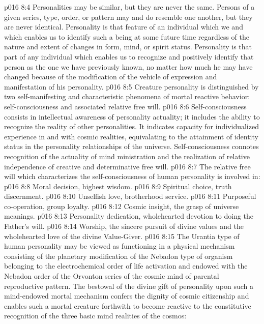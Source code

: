\vs p016 8:4 Personalities may be similar, but they are never the same. Persons of a given series, type, order, or pattern may and do resemble one another, but they are never identical. Personality is that feature of an individual which we  and which enables us to identify such a being at some future time regardless of the nature and extent of changes in form, mind, or spirit status. Personality is that part of any individual which enables us to recognize and positively identify that person as the one we have previously known, no matter how much he may have changed because of the modification of the vehicle of expression and manifestation of his personality.
\vs p016 8:5 \pc Creature personality is distinguished by two self\hyp{}manifesting and characteristic phenomena of mortal reactive behavior: self\hyp{}consciousness and associated relative free will.
\vs p016 8:6 Self\hyp{}consciousness consists in intellectual awareness of personality actuality; it includes the ability to recognize the reality of other personalities. It indicates capacity for individualized experience in and with cosmic realities, equivalating to the attainment of identity status in the personality relationships of the universe. Self\hyp{}consciousness connotes recognition of the actuality of mind ministration and the realization of relative independence of creative and determinative free will.
\vs p016 8:7 \pc The relative free will which characterizes the self\hyp{}consciousness of human personality is involved in:
\vs p016 8:8 \bibnobreakspace Moral decision, highest wisdom.
\vs p016 8:9 \bibnobreakspace Spiritual choice, truth discernment.
\vs p016 8:10 \bibnobreakspace Unselfish love, brotherhood service.
\vs p016 8:11 \bibnobreakspace Purposeful co\hyp{}operation, group loyalty.
\vs p016 8:12 \bibnobreakspace Cosmic insight, the grasp of universe meanings.
\vs p016 8:13 \bibnobreakspace Personality dedication, wholehearted devotion to doing the Father’s will.
\vs p016 8:14 \bibnobreakspace Worship, the sincere pursuit of divine values and the wholehearted love of the divine Value\hyp{}Giver.
\vs p016 8:15 \pc The Urantia type of human personality may be viewed as functioning in a physical mechanism consisting of the planetary modification of the Nebadon type of organism belonging to the electrochemical order of life activation and endowed with the Nebadon order of the Orvonton series of the cosmic mind of parental reproductive pattern. The bestowal of the divine gift of personality upon such a mind\hyp{}endowed mortal mechanism confers the dignity of cosmic citizenship and enables such a mortal creature forthwith to become reactive to the constitutive recognition of the three basic mind realities of the cosmos:
